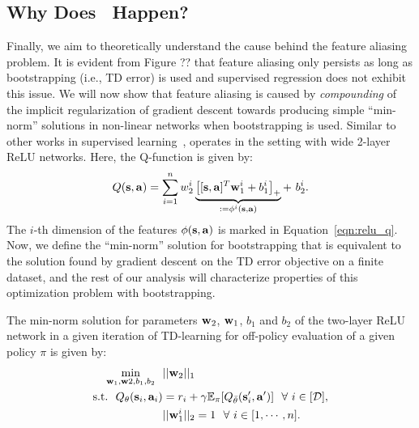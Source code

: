 \fi

\iffalse

\subsection{Why Does \AliasingProblemName\ Happen?}
\label{sec:why_does_aliasing_happen}

Finally, we aim to theoretically understand the cause behind the feature aliasing problem. It is evident from Figure ?? that feature aliasing only persists as long as bootstrapping (i.e., TD error) is used and supervised regression does not exhibit this issue. We will now show that feature aliasing is caused by \emph{compounding} of the implicit regularization of gradient descent towards producing simple ``min-norm'' solutions in non-linear networks when bootstrapping is used.
Similar to other works in supervised learning~\citep{savarese2019infinite}, operates in the setting with wide 2-layer ReLU networks.
Here, the Q-function is given by:
\begin{equation}
    Q(\mathbf{s}, \mathbf{a}) = \sum_{i=1}^{n} w^i_2 \underbrace{\left[ [\mathbf{s}, \mathbf{a}]^T \mathbf{w}^i_1 + b^i_1  \right]_{+}}_{:= \phi^i(\mathbf{s}, \mathbf{a})} +~ b^i_2.
\label{eqn:relu_q}
\end{equation}
The $i$-th dimension of the features $\phi(\mathbf{s}, \mathbf{a})$ is marked in Equation~\ref{eqn:relu_q}. Now, we define the ``min-norm'' solution for bootstrapping that is equivalent to the solution found by gradient descent on the TD error objective on a finite dataset, and the rest of our analysis will characterize properties of this optimization problem with bootstrapping.
\begin{definition}
\label{eqn:min_norm}
The min-norm solution for parameters $\mathbf{w}_2$, $\mathbf{w}_1$, $b_1$ and $b_2$ of the two-layer ReLU network in a given iteration of TD-learning for off-policy evaluation of a given policy $\pi$ is given by:
\begin{align*}
    \min_{\mathbf{w}_1, \mathbf{w}2, b_1, b_2}~~ & ||\mathbf{w}_2||_1 \\
    \text{s.t.}~~ Q_\theta(\mathbf{s}_i, \mathbf{a}_i) &= r_i + \gamma \mathbb{E}_{\pi}[Q_{\bar{\theta}}(\mathbf{s}'_i, \mathbf{a}')]~~ \forall~ i \in [\mathcal{D}],\\
    & ||\mathbf{w}^i_1||_2 = 1~~ \forall~ i \in [1,\cdots, n].
\end{align*}
\end{definition}
